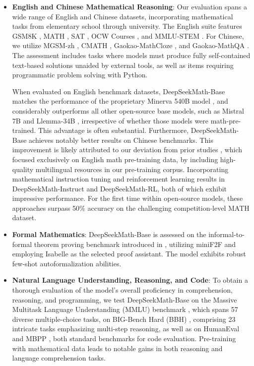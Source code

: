 \begin{itemize}[topsep=0pt]
    \item \textbf{English and Chinese Mathematical Reasoning}: Our evaluation spans a wide range of English and Chinese datasets, incorporating mathematical tasks from elementary school through university. The English suite features GSM8K \citep{gsm8k}, MATH \citep{MATH}, SAT \citep{llemma}, OCW Courses \citep{minerva}, and MMLU-STEM \citep{mmlu}. For Chinese, we utilize MGSM-zh \citep{mgsm}, CMATH \citep{wei2023cmath}, Gaokao-MathCloze \citep{agieval}, and Gaokao-MathQA \citep{agieval}. The assessment includes tasks where models must produce fully self-contained text-based solutions unaided by external tools, as well as items requiring programmatic problem solving with Python.

When evaluated on English benchmark datasets, DeepSeekMath-Base matches the performance of the proprietary Minerva 540B model \citep{minerva}, and considerably outperforms all other open-source base models, such as Mistral 7B \citep{mistral} and Llemma-34B \citep{llemma}, irrespective of whether those models were math-pre-trained. This advantage is often substantial. Furthermore, DeepSeekMath-Base achieves notably better results on Chinese benchmarks. This improvement is likely attributed to our deviation from prior studies \citep{minerva,llemma}, which focused exclusively on English math pre-training data, by including high-quality multilingual resources in our pre-training corpus. Incorporating mathematical instruction tuning and reinforcement learning results in DeepSeekMath-Instruct and DeepSeekMath-RL, both of which exhibit impressive performance. For the first time within open-source models, these approaches surpass 50\% accuracy on the challenging competition-level MATH dataset.

\item \textbf{Formal Mathematics}: DeepSeekMath-Base is assessed on the informal-to-formal theorem proving benchmark introduced in \citep{dsp_proof}, utilizing miniF2F \citep{minif2f} and employing Isabelle \citep{isabelle} as the selected proof assistant. The model exhibits robust few-shot autoformalization abilities.
\item \textbf{Natural Language Understanding, Reasoning, and Code}: To obtain a thorough evaluation of the model's overall proficiency in comprehension, reasoning, and programming, we test DeepSeekMath-Base on the Massive Multitask Language Understanding (MMLU) benchmark \citep{mmlu}, which spans 57 diverse multiple-choice tasks, on BIG-Bench Hard (BBH) \citep{bbh}, comprising 23 intricate tasks emphasizing multi-step reasoning, as well as on HumanEval \citep{codex} and MBPP \citep{mbpp}, both standard benchmarks for code evaluation. Pre-training with mathematical data leads to notable gains in both reasoning and language comprehension tasks.


\end{itemize}
